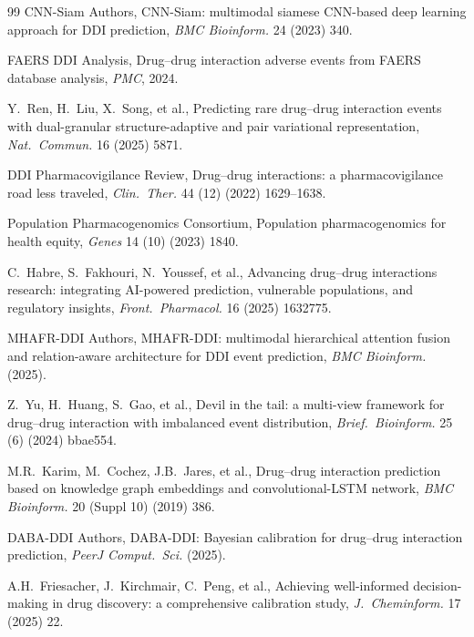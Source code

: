 \documentclass[11pt,a4paper,twocolumn]{article}
\begin{document}
\begin{thebibliography}{99}
CNN-Siam Authors,
CNN-Siam: multimodal siamese CNN-based deep learning approach for DDI prediction,
\emph{BMC Bioinform.} 24 (2023) 340.

FAERS DDI Analysis,
Drug--drug interaction adverse events from FAERS database analysis,
\emph{PMC}, 2024.

Y.\ Ren, H.\ Liu, X.\ Song, et al.,
Predicting rare drug--drug interaction events with dual-granular structure-adaptive and pair variational representation,
\emph{Nat.\ Commun.} 16 (2025) 5871.

DDI Pharmacovigilance Review,
Drug--drug interactions: a pharmacovigilance road less traveled,
\emph{Clin.\ Ther.} 44 (12) (2022) 1629--1638.

Population Pharmacogenomics Consortium,
Population pharmacogenomics for health equity,
\emph{Genes} 14 (10) (2023) 1840.

C.\ Habre, S.\ Fakhouri, N.\ Youssef, et al.,
Advancing drug--drug interactions research: integrating AI-powered prediction, vulnerable populations, and regulatory insights,
\emph{Front.\ Pharmacol.} 16 (2025) 1632775.

MHAFR-DDI Authors,
MHAFR-DDI: multimodal hierarchical attention fusion and relation-aware architecture for DDI event prediction,
\emph{BMC Bioinform.} (2025).

Z.\ Yu, H.\ Huang, S.\ Gao, et al.,
Devil in the tail: a multi-view framework for drug--drug interaction with imbalanced event distribution,
\emph{Brief.\ Bioinform.} 25 (6) (2024) bbae554.

M.R.\ Karim, M.\ Cochez, J.B.\ Jares, et al.,
Drug--drug interaction prediction based on knowledge graph embeddings and convolutional-LSTM network,
\emph{BMC Bioinform.} 20 (Suppl 10) (2019) 386.

DABA-DDI Authors,
DABA-DDI: Bayesian calibration for drug--drug interaction prediction,
\emph{PeerJ Comput.\ Sci.} (2025).

A.H.\ Friesacher, J.\ Kirchmair, C.\ Peng, et al.,
Achieving well-informed decision-making in drug discovery: a comprehensive calibration study,
\emph{J.\ Cheminform.} 17 (2025) 22.

\end{thebibliography}
\end{document}
